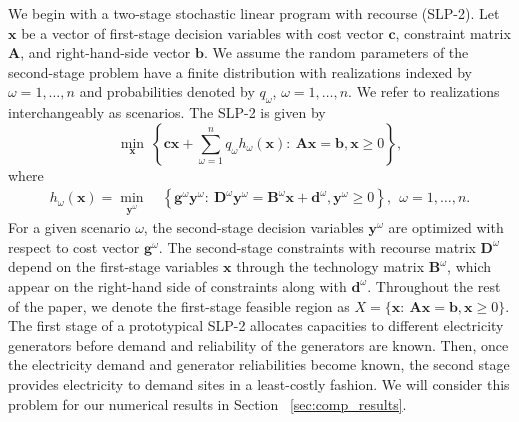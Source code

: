 \documentclass[opre,nonblindrev]{informs3} %
\newcommand{\x}{\mathbf{x}}
\newcommand{\y}{\mathbf{y}}
\renewcommand{\c}{\mathbf{c}}
\newcommand{\A}{\mathbf{A}}
\renewcommand{\b}{\mathbf{b}}
\newcommand{\g}{\mathbf{g}}
\newcommand{\D}{\mathbf{D}}
\newcommand{\B}{\mathbf{B}}
\renewcommand{\d}{\mathbf{d}}
\newcommand{\plp}{$\phi$LP-2}
\begin{document}
We begin with a two-stage stochastic linear program with recourse (SLP-2).
Let $\x$ be a vector of first-stage decision variables with cost vector $\c$, constraint matrix $\A$, and right-hand-side vector $\b$.
We assume the random parameters of the second-stage problem have a finite distribution with realizations indexed by $\omega = 1, \dots, n$ and probabilities denoted by $q_\omega$,  $\omega = 1, \dots, n$. 
We refer to realizations interchangeably as scenarios. 
The SLP-2 is given by
\begin{equation}
	\min_\x \ \left\{ \c\x + \sum_{\omega=1}^n q_\omega h_\omega(\x) : \ \A\x = \b, \x \geq 0 \right\}, \label{eq:slp_first_stage}
\end{equation}
where
\begin{align}
	h_\omega(\x) = \min_{\y^\omega} \ & \left\{ \g^\omega \y^\omega : \  \D^\omega \y^\omega = \B^\omega \x + \d^\omega, \y^\omega \geq 0 \right\}, \ \   \omega = 1, \dots, n. \label{eq:slp_second_stage}
\end{align}
For a given scenario $\omega$, the second-stage decision variables $\y^\omega$ are optimized with respect to cost vector $\g^{\omega}$. 
The second-stage constraints with recourse matrix $\D^{\omega}$ depend on the first-stage variables $\x$ through the technology matrix $\B^{\omega}$, which appear on the right-hand side of constraints along with $\d^{\omega}$. 
Throughout the rest of the paper, we denote the first-stage feasible region as $X = \{\x : \ \A\x = \b, \x \geq 0\}$.
The first stage of a prototypical SLP-2 allocates capacities to different electricity generators before demand and reliability of the generators are known. 
Then, once the electricity demand and generator reliabilities become known, the second stage provides electricity to demand sites in a least-costly fashion. 
We will consider this problem for our numerical results in Section ~\ref{sec:comp_results}.

\end{document}
